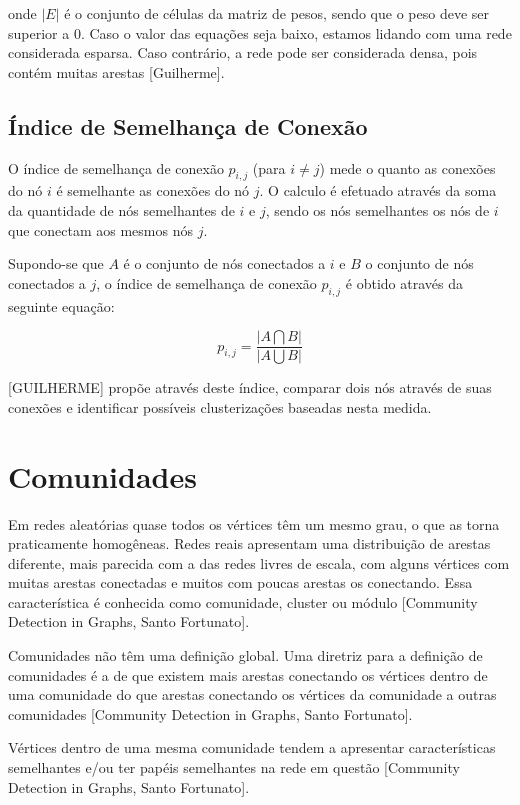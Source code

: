 \documentclass[xindy,rascunho]{fei}
\begin{document}
onde $|E|$ é o conjunto de células da matriz de pesos, sendo que o peso deve ser superior a 0. 
Caso o valor das equações seja baixo, estamos lidando com uma rede considerada esparsa. Caso contrário, a rede pode ser considerada densa, pois contém muitas arestas [Guilherme].

\subsection{Índice de Semelhança de Conexão}
O índice de semelhança de conexão $p_{i,j}$ (para $i \neq j$) mede o quanto as conexões do nó $i$ é semelhante as conexões do nó $j$. O calculo é efetuado através da soma da quantidade de nós semelhantes de $i$ e $j$, sendo os nós semelhantes os nós de $i$ que conectam aos mesmos nós $j$.

Supondo-se que $A$ é o conjunto de nós conectados a $i$ e $B$ o conjunto de nós conectados a $j$, o índice de semelhança de conexão $p_{i,j}$ é obtido através da seguinte equação:

\begin{equation} \label{eq:IndiceSemelhanca}
p_{i,j} = \frac{|A \bigcap B|}{|A \bigcup B|}
\end{equation}

[GUILHERME] propõe através deste índice, comparar dois nós através de suas conexões e identificar possíveis clusterizações baseadas nesta medida.

\section{Comunidades}
Em redes aleatórias quase todos os vértices têm um mesmo grau, o que as torna praticamente homogêneas. Redes reais apresentam uma distribuição de arestas diferente, mais parecida com a das redes livres de escala, com alguns vértices com muitas arestas conectadas e muitos com poucas arestas os conectando. Essa característica é conhecida como comunidade, cluster ou módulo [Community Detection in Graphs, Santo Fortunato].

Comunidades não têm uma definição global. Uma diretriz para a definição de comunidades é a de que existem mais arestas conectando os vértices dentro de uma comunidade do que arestas conectando os vértices da comunidade a outras comunidades [Community Detection in Graphs, Santo Fortunato].

Vértices dentro de uma mesma comunidade tendem a apresentar características semelhantes e/ou ter papéis semelhantes na rede em questão [Community Detection in Graphs, Santo Fortunato].
\end{document}
